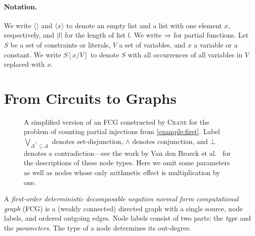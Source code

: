 \documentclass{article}
\theoremstyle{definition}
\newcommand\pfun{\mathrel{\ooalign{\hfil$\mapstochar\mkern5mu$\hfil\cr$\to$\cr}}}
\DeclareMathOperator{\CR}{\textsc{CR}}
\DeclareMathOperator{\GDR}{\textsc{GDR}}
\DeclareMathOperator{\Reff}{\textsc{Ref}}
\begin{document}
\paragraph*{Notation.}
We write $\langle\rangle$ and $\langle x \rangle$ to denote an empty list and a
list with one element $x$, respectively, and $|l|$ for the length of list $l$.
We write $\pfun$ for partial functions. Let $S$ be a set of constraints or
literals, $V$ a set of variables, and $x$ a variable or a constant. We write
$S[x/V]$ to denote $S$ with all occurrences of all variables in $V$ replaced
with $x$.

\section{From Circuits to Graphs}\label{sec:methods}

\begin{figure}[t]
  \centering
  \caption{A simplified version of an FCG constructed by \textsc{Crane} for the
    problem of counting partial injections from \cref{example:first}. Label
    $\bigvee_{\Delta^\top \subseteq \Delta}$ denotes set-disjunction, $\land$
    denotes conjunction, and $\bot$ denotes a contradiction---see the work by
    Van den Broeck et al.~\protect{} for
    the descriptions of these node types. Here we omit some parameters as well
    as nodes whose only arithmetic effect is multiplication by
    one.}\label{fig:examplefcg}
\end{figure}


A \emph{first-order deterministic decomposable negation normal form
  computational graph} (FCG) is a (weakly connected) directed graph with a
single source, node labels, and ordered outgoing edges. Node
labels consist of two parts: the \emph{type} and the \emph{parameters}. The type
of a node determines its out-degree.
\end{document}
